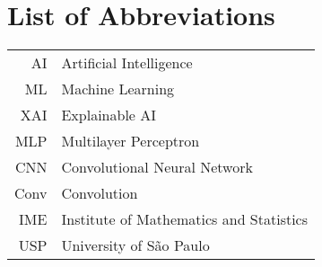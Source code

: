 \documentclass[a4paper,12pt,twoside,brazilian,english]{book}
\begin{document}
\cleardoublepage


\newcommand\disablenewpage[1]{{\let\clearpage\par\let\cleardoublepage\par #1}}

\bgroup
\raggedbottom


\disablenewpage{\chapter*{List of Abbreviations}}

\begin{tabular}{rl}
  AI  & Artificial Intelligence \\
  ML & Machine Learning \\
  XAI & Explainable AI \\
  MLP & Multilayer Perceptron \\
  CNN & Convolutional Neural Network \\
  Conv & Convolution \\
  IME & Institute of Mathematics and Statistics\\
  USP & University of São Paulo
\end{tabular}
\end{document}
